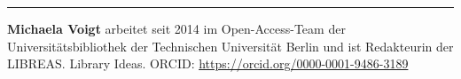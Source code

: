 \begin{center}\rule{0.5\linewidth}{0.5pt}\end{center}

\textbf{Michaela Voigt} arbeitet seit 2014 im Open-Access-Team der
Universitätsbibliothek der Technischen Universität Berlin und ist
Redakteurin der LIBREAS. Library Ideas. ORCID:
\url{https://orcid.org/0000-0001-9486-3189}
